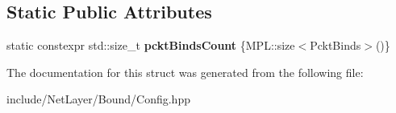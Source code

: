 \subsection*{Static Public Attributes}
\begin{DoxyCompactItemize}
\item 
\hypertarget{structexperiment_1_1Config_a4cf90d96b9f16ce019cc71a75d5b7f9a}{}static constexpr std\+::size\+\_\+t {\bfseries pckt\+Binds\+Count} \{M\+P\+L\+::size$<$Pckt\+Binds$>$()\}\label{structexperiment_1_1Config_a4cf90d96b9f16ce019cc71a75d5b7f9a}

\end{DoxyCompactItemize}


The documentation for this struct was generated from the following file\+:\begin{DoxyCompactItemize}
\item 
include/\+Net\+Layer/\+Bound/Config.\+hpp\end{DoxyCompactItemize}
